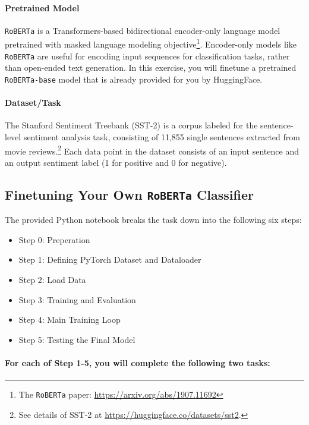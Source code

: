 \documentclass{article}
\newcommand{\sst}{SST-2\xspace}
\newcommand{\modelthree}{RoBERTa-base\xspace}
\begin{document}
\paragraph{Pretrained Model}

\texttt{RoBERTa} is a Transformers-based bidirectional encoder-only language
model pretrained with masked language modeling objective\footnote{The
\texttt{RoBERTa} paper: \url{https://arxiv.org/abs/1907.11692}}. Encoder-only
models like \texttt{RoBERTa} are useful for encoding input sequences for
classification tasks, rather than open-ended text generation. In this exercise,
you will finetune a pretrained \texttt{\modelthree} model that is already
provided for you by HuggingFace.

\paragraph{Dataset/Task}
The Stanford Sentiment Treebank (\sst) is a corpus labeled for the
sentence-level sentiment analysis task, consisting of 11,855 single sentences
extracted from movie reviews.\footnote{See details of SST-2 at
\url{https://huggingface.co/datasets/sst2}.} Each data point in the dataset
consists of an input sentence and an output sentiment label (1 for positive and
0 for negative).

\subsection{Finetuning Your Own \texttt{RoBERTa} Classifier}

The provided Python notebook breaks the task down into the following six steps:

\begin{itemize}
    \item Step 0: Preperation
    \item Step 1: Defining PyTorch Dataset and Dataloader
    \item Step 2: Load Data
    \item Step 3: Training and Evaluation
    \item Step 4: Main Training Loop
    \item Step 5: Testing the Final Model
\end{itemize}

\paragraph{For each of Step 1-5, you will complete the following two tasks:}
\end{document}
